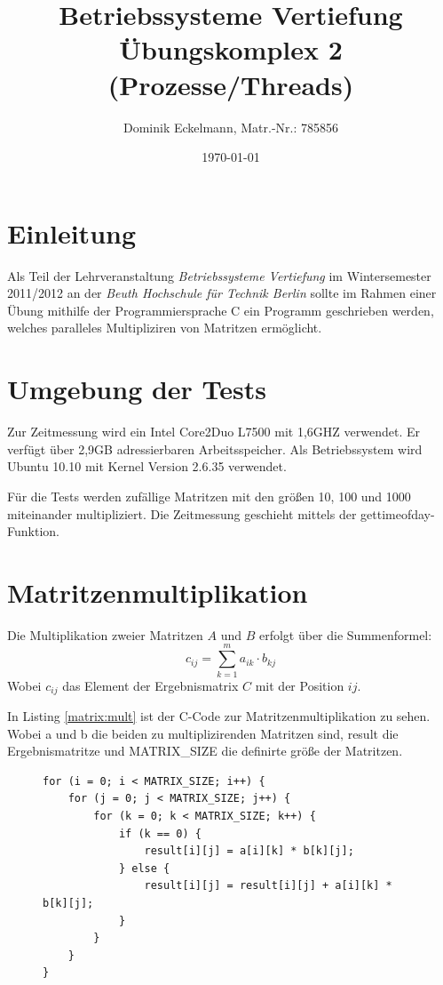 \documentclass[a4paper]{article}
\title{Betriebssysteme Vertiefung \\ Übungskomplex 2 (Prozesse/Threads)}
\author{Dominik Eckelmann, Matr.-Nr.: 785856}
\date{\today}
\begin{document}
\maketitle

\tableofcontents

\section{Einleitung}
Als Teil der Lehrveranstaltung \textit{Betriebssysteme Vertiefung} im Wintersemester 2011/2012 an der \textit{Beuth Hochschule für Technik Berlin} sollte im Rahmen einer Übung mithilfe der Programmiersprache C ein Programm geschrieben werden, welches paralleles Multipliziren von Matritzen
ermöglicht.

\section{Umgebung der Tests}
Zur Zeitmessung wird ein Intel Core2Duo L7500 mit 1,6GHZ verwendet. Er verfügt über 2,9GB
adressierbaren Arbeitsspeicher. Als Betriebssystem wird Ubuntu 10.10 mit Kernel Version
2.6.35 verwendet.

Für die Tests werden zufällige Matritzen mit den größen 10, 100 und 1000 miteinander
multipliziert. Die Zeitmessung geschieht mittels der gettimeofday-Funktion.

\section{Matritzenmultiplikation}
Die Multiplikation zweier Matritzen $A$ und $B$ erfolgt über die Summenformel:
\[ c_{ij}=\sum_{k=1}^m a_{ik}\cdot b_{kj} \]
Wobei $c_{ij}$ das Element der Ergebnismatrix $C$ mit der Position $ij$.

In Listing \ref{matrix:mult} ist der C-Code zur Matritzenmultiplikation zu sehen.
Wobei a und b die beiden zu multiplizirenden Matritzen sind, result die Ergebnismatritze
und MATRIX\_SIZE die definirte größe der Matritzen.

\begin{figure}[h!]
\begin{lstlisting}
for (i = 0; i < MATRIX_SIZE; i++) {
	for (j = 0; j < MATRIX_SIZE; j++) {
		for (k = 0; k < MATRIX_SIZE; k++) {
			if (k == 0) {
				result[i][j] = a[i][k] * b[k][j];
			} else {
				result[i][j] = result[i][j] + a[i][k] * b[k][j];
			}
		}
	}
}
\end{lstlisting}
\end{figure}
\end{document}
